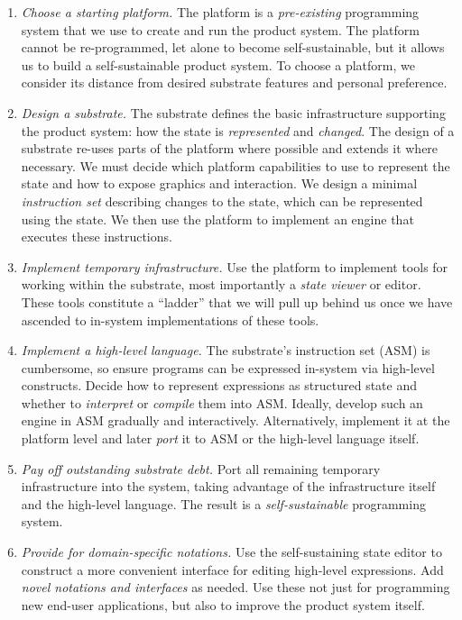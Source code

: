 \documentclass[ twoside,openright,titlepage,numbers=noenddot,headinclude,footinclude,cleardoublepage=empty,abstract=on,
                BCOR=5mm,paper=a4,fontsize=11pt
                ]{scrreprt}
\providecommand{\tightlist}{}\newenvironment{longtable}[2]{\begin{tabular}}{\end{tabular}}
\theoremstyle{definition}
\begin{document}
\begin{enumerate}
\def\labelenumi{\arabic{enumi}.}
\tightlist
\item
  \emph{Choose a starting platform.} The platform is a
  \emph{pre-existing} programming system that we use to create and run
  the product system. The platform cannot be re-programmed, let alone to
  become self-sustainable, but it allows us to build a self-sustainable
  product system. To choose a platform, we consider its distance from
  desired substrate features and personal preference.
\item
  \emph{Design a substrate.} The substrate defines the basic
  infrastructure supporting the product system: how the state is
  \emph{represented} and \emph{changed}. The design of a substrate
  re-uses parts of the platform where possible and extends it where
  necessary. We must decide which platform capabilities to use to
  represent the state and how to expose graphics and interaction. We
  design a minimal \emph{instruction set} describing changes to the
  state, which can be represented using the state. We then use the
  platform to implement an engine that executes these instructions.
\item
  \emph{Implement temporary infrastructure.} Use the platform to
  implement tools for working within the substrate, most importantly a
  \emph{state viewer} or editor. These tools constitute a ``ladder''
  that we will pull up behind us once we have ascended to in-system
  implementations of these tools.
\item
  \emph{Implement a high-level language.} The substrate's instruction
  set (ASM) is cumbersome, so ensure programs can be expressed in-system
  via high-level constructs. Decide how to represent expressions as
  structured state and whether to \emph{interpret} or \emph{compile}
  them into ASM. Ideally, develop such an engine in ASM gradually and
  interactively. Alternatively, implement it at the platform level and
  later \emph{port} it to ASM or the high-level language itself.
\item
  \emph{Pay off outstanding substrate debt.} Port all remaining
  temporary infrastructure into the system, taking advantage of the
  infrastructure itself and the high-level language. The result is a
  \emph{self-sustainable} programming system.
\item
  \emph{Provide for domain-specific notations.} Use the self-sustaining
  state editor to construct a more convenient interface for editing
  high-level expressions. Add \emph{novel notations and interfaces} as
  needed. Use these not just for programming new end-user applications,
  but also to improve the product system itself.
\end{enumerate}
\end{document}
